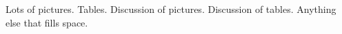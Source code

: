 Lots of pictures. Tables. Discussion of pictures. Discussion of tables. Anything else that fills space.